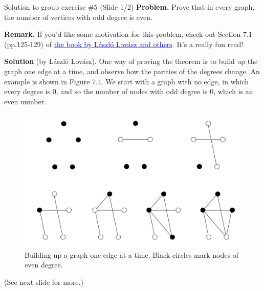 \documentclass[10pt]{beamer}
\begin{document}
\begin{frame}{Solution to group exercise \#5 (Slide 1/2)} 
\footnotesize 
\textbf{Problem.} Prove that in every graph, the number of vertices with odd degree is even. 

\vfill 
\textbf{Remark.} If you'd like some motivation for this problem, check out Section 7.1 (pp.125-129) of \href{https://file.fouladi.ir/courses/discmath/books/Springer.Verlag.Discrete.Mathematics.Elementary.and.Beyond.ebook-TLFeBOOK.pdf}{\underline{\textcolor{blue}{the book by L\'aszl\'o Lov\'asz and others}}}.  It's a really fun read!

\vfill 

\textbf{Solution} (by L\'aszl\'o Lov\'asz).  One way of proving the theorem is to build up the graph one edge at a time, and observe how the parities of the degrees change. An example is shown in Figure 7.4. We start with a graph with no edge, in which every degree is 0, and so the number of nodes with odd degree is 0, which is an even number.
 
\begin{figure}
\includegraphics[width=.4\linewidth]{images/number_of_nodes_with_odd_degree_is_even.png}	
\caption{Building up a graph one edge at a time. Black circles mark nodes of even degree.}
\end{figure}

\hfill (See next slide for more.)

\end{frame}
\end{document}
